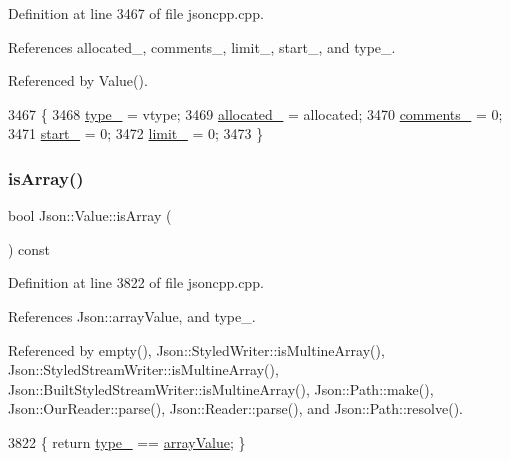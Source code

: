 Definition at line 3467 of file jsoncpp.\+cpp.



References allocated\+\_\+, comments\+\_\+, limit\+\_\+, start\+\_\+, and type\+\_\+.



Referenced by Value().


\begin{DoxyCode}
3467                                                      \{
3468   \hyperlink{class_json_1_1_value_abd222c2536dc88bf330dedcd076d2356}{type\_} = vtype;
3469   \hyperlink{class_json_1_1_value_ae0126c80dc4907aad94088553fc7632b}{allocated\_} = allocated;
3470   \hyperlink{class_json_1_1_value_a2016564cabc7a29208e97bd0b782a4e4}{comments\_} = 0;
3471   \hyperlink{class_json_1_1_value_a1c3aeb0fa8fefe93776cb347c76a25a8}{start\_} = 0;
3472   \hyperlink{class_json_1_1_value_afe377e25f6d3b5b8ea7221c84f29412a}{limit\_} = 0;
3473 \}
\end{DoxyCode}
\mbox{\label{class_json_1_1_value_a1627eb9d6568d6d0252fa8bb711c0a59}} 
\subsubsection{\texorpdfstring{is\+Array()}{isArray()}}
{\footnotesize\ttfamily bool Json\+::\+Value\+::is\+Array (\begin{DoxyParamCaption}{ }\end{DoxyParamCaption}) const}



Definition at line 3822 of file jsoncpp.\+cpp.



References Json\+::array\+Value, and type\+\_\+.



Referenced by empty(), Json\+::\+Styled\+Writer\+::is\+Multine\+Array(), Json\+::\+Styled\+Stream\+Writer\+::is\+Multine\+Array(), Json\+::\+Built\+Styled\+Stream\+Writer\+::is\+Multine\+Array(), Json\+::\+Path\+::make(), Json\+::\+Our\+Reader\+::parse(), Json\+::\+Reader\+::parse(), and Json\+::\+Path\+::resolve().


\begin{DoxyCode}
3822 \{ \textcolor{keywordflow}{return} \hyperlink{class_json_1_1_value_abd222c2536dc88bf330dedcd076d2356}{type\_} == \hyperlink{namespace_json_a7d654b75c16a57007925868e38212b4eadc8f264f36b55b063c78126b335415f4}{arrayValue}; \}
\end{DoxyCode}
\mbox{\label{class_json_1_1_value_ab1f02651cb89d0f18b63a036959391ba}} 
